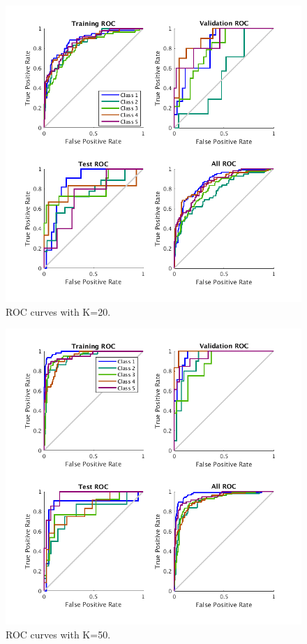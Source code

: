 \documentclass{article}
\begin{document}
\begin{figure}[Ht]
\centering
\includegraphics[scale=0.5]{Figures/Metrics/roc_k20}
\caption{ROC curves with K=20.}
\label{fig:r20}
\end{figure}
\begin{figure}[Ht]
\centering
\includegraphics[scale=0.5]{Figures/Metrics/roc_k50}
\caption{ROC curves with K=50.}
\label{fig:r50}
\end{figure}
\end{document}
